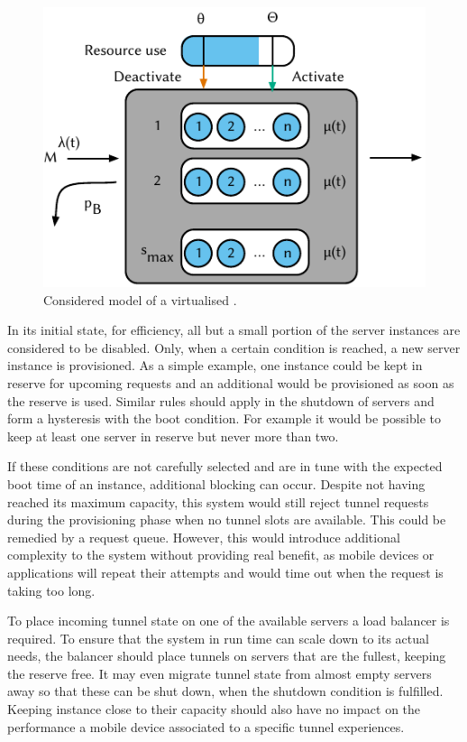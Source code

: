 \begin{figure}
  \centering
  \includegraphics{cloud/virtualized_network_functions/model/figures/virtual_ggsn}
  \caption{Considered model of a virtualised .}
  \label{sec:cloud:virtualized_network_functions:model:virtual_ggsn:model}
\end{figure} 

In its initial state, for efficiency, all but a small portion of the server instances are considered to be disabled.
Only, when a certain condition is reached, a new server instance is provisioned.
As a simple example, one instance could be kept in reserve for upcoming requests and an additional would be provisioned as soon as the reserve is used.
Similar rules should apply in the shutdown of servers and form a hysteresis with the boot condition.
For example it would be possible to keep at least one server in reserve but never more than two.

If these conditions are not carefully selected and are in tune with the expected boot time of an instance, additional blocking can occur.
Despite not having reached its maximum capacity, this system would still reject tunnel requests during the provisioning phase when no tunnel slots are available.
This could be remedied by a request queue.
However, this would introduce additional complexity to the system without providing real benefit, as mobile devices or applications will repeat their attempts and would time out when the request is taking too long. 

To place incoming tunnel state on one of the available servers a load balancer is required. 
To ensure that the system in run time can scale down to its actual needs, the balancer should place tunnels on servers that are the fullest, keeping the reserve free.
It may even migrate tunnel state from almost empty servers away so that these can be shut down, when the shutdown condition is fulfilled.
Keeping instance close to their capacity should also have no impact on the performance a mobile device associated to a specific tunnel experiences.
